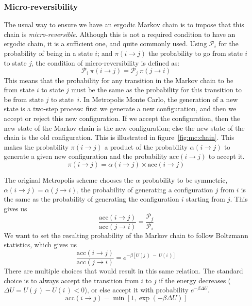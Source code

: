 \documentclass[thesis]{subfiles}
\begin{document}
\subsubsection{Micro-reversibility}

The usual way to ensure we have an ergodic Markov chain is to impose that this
chain is \emph{micro-reversible}. Although this is not a required condition to
have an ergodic chain, it is a sufficient one\cite{Frenkel2002}, and quite
commonly used. Using $\mathcal{P}_i$ for the probability of being in a state
$i$; and $\pi(i \to j)$ the probability to go from state $i$ to state $j$, the
condition of micro-reversibility is defined as:
\[ \mathcal{P}_i \ \pi(i \to j) = \mathcal{P}_j \ \pi(j \to i)\]
This means that the probability for any transition in the Markov chain to be
from state $i$ to state $j$ must be the same as the probability for this
transition to be from state $j$ to state~$i$. In Metropolis Monte Carlo, the
generation of a new state is a two-step process: first we generate a new
configuration, and then we accept or reject this new configuration. If we accept
the configuration, then the new state of the Markov chain is the new
configuration; else the new state of the chain is the old configuration. This is
illustrated in figure~\ref{fig:mc:chain}. This makes the probability $\pi(i \to
j)$ a product of the probability $\alpha(i \to j)$ to generate a given new
configuration and the probability $\text{acc}(i \to j)$ to accept it.
\[\pi(i \to j) = \alpha(i \to j)\times\text{acc}(i \to j)\]

The original Metropolis scheme\cite{Metropolis1953} chooses the $\alpha$
probability to be symmetric, \ie $\alpha(i \to j) = \alpha(j \to i)$, the
probability of generating a configuration $j$ from $i$ is the same as the
probability of generating the configuration $i$ starting from $j$. This gives us
\[ \frac{\text{acc}(i \to j)}{\text{acc}(j \to i)} = \frac{\mathcal{P}_j}{\mathcal{P}_i} \label{eq:mc:acceptance}\]
We want to set the resulting probability of the Markov chain to follow Boltzmann
statistics, which gives us
\[ \frac{\text{acc}(i \to j)}{\text{acc}(j \to i)} = e^{-\beta [U(j\,) \;-\; U(i\,)]} \]
There are multiple choices that would result in this same relation. The standard
choice is to always accept the transition from $i$ to $j$ if the energy
decreases ($\Delta U = U(j\,) - U(i\,) < 0$), or else accept it with probability
$e^{-\beta \Delta U}$.
\[\text{acc}(i \to j) = \min\left[1, \exp\left(-\beta \Delta U\right)\right] \label{eq:mc:acceptance:nvt}\]
\end{document}

